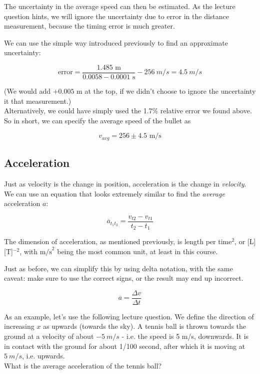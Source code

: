 The uncertainty in the average speed can then be estimated. As the lecture question hints, we will ignore the uncertainty due to error in the distance measurement, because the timing error is much greater.

We can use the simple way introduced previously to find an approximate uncertainty:

\begin{equation}
\text{error} = \frac{1.485 \text{ m}}{0.0058 - 0.0001 \text{ s}} - \SI{256}{m/s} = \SI{4.5}{m/s}
\end{equation}

(We would add $+0.005$ m at the top, if we didn't choose to ignore the uncertainty it that measurement.)\\
Alternatively, we could have simply used the 1.7\% relative error we found above.\\
So in short, we can specify the average speed of the bullet as

\begin{equation}
v_{avg} = 256 \pm 4.5 \text{ m/s}
\end{equation}

\subsection{Acceleration}

Just as velocity is the change in position, acceleration is the change in \emph{velocity}. We can use an equation that looks extremely similar to find the \emph{average} acceleration $a$:

\begingroup
\large
\begin{equation}
 \overbar{a}_{t_1 t_2} = \frac{v_{t2} - v_{t1}}{t_2 - t_1}
\end{equation}
\endgroup

The dimension of acceleration, as mentioned previously, is length per time${}^2$, or [L] [T]${}^{-2}$, with $\text{m/s}^2$ being the most common unit, at least in this course.

Just as before, we can simplify this by using delta notation, with the same caveat: make sure to use the correct signs, or the result may end up incorrect.

\begin{equation}
\overbar{a} = \frac{\Delta v}{\Delta t}
\end{equation}

As an example, let's use the following lecture question. We define the direction of increasing $x$ as upwards (towards the sky). A tennis ball is thrown towards the ground at a velocity of about $\SI{-5}{m/s}$ - i.e. the speed is 5 m/s, downwards. It is in contact with the ground for about 1/100 second, after which it is moving at $\SI{+5}{m/s}$, i.e. upwards.\\
What is the average acceleration of the tennis ball?


